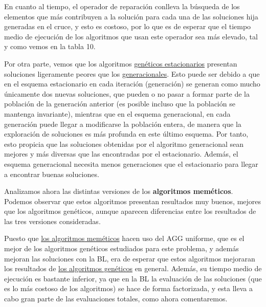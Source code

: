 \documentclass[10pt,a4paper]{article}
\begin{document}
	En cuanto al tiempo, el operador de reparación conlleva la búsqueda de los elementos que más contribuyen a la solución para cada una de las soluciones hija generadas en el cruce, y esto es costoso, por lo que es de esperar que el tiempo medio de ejecución de los algoritmos que usan este operador sea más elevado, tal y como vemos en la tabla 10.
	
	Por otra parte, vemos que los algoritmos \underline{genéticos estacionarios} presentan soluciones ligeramente peores que los \underline{generacionales}. Esto puede ser debido a que en el esquema estacionario en cada iteración (generación) se generan como mucho únicamente dos nuevas soluciones, que pueden o no pasar a formar parte de la población de la generación anterior (es posible incluso que la población se mantenga invariante), mientras que en el esquema generacional, en cada generación puede llegar a modificarse la población entera, de manera que la exploración de soluciones es más profunda en este último esquema. Por tanto, esto propicia que las soluciones obtenidas por el algoritmo generacional sean mejores y más diversas que las encontradas por el estacionario. Además, el esquema generacional necesita menos generaciones que el estacionario para llegar a encontrar buenas soluciones.
	


	Analizamos ahora las distintas versiones de los \textbf{algoritmos meméticos}. Podemos observar que estos algoritmos presentan resultados muy buenos, mejores que los algoritmos genéticos, aunque aparecen diferencias entre los resultados de las tres versiones consideradas. 
	
	Puesto que \underline{los algoritmos meméticos} hacen uso del AGG uniforme, que es el mejor de los algoritmos genéticos estudiados para este problema, y además mejoran las soluciones con la BL, era de esperar que estos algoritmos mejoraran los resultados de \underline{los algoritmos genéticos} en general. Además, su tiempo medio de ejecución es bastante inferior, ya que en la BL la evaluación de las soluciones (que es lo más costoso de los algoritmos) se hace de forma factorizada, y esta lleva a cabo gran parte de las evaluaciones totales, como ahora comentaremos. 
	
\end{document}
